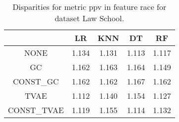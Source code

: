 \begin{table}
\caption{Disparities for metric ppv in feature race for dataset Law School.}
\label{tab:disp-LAW SCHOOL-race-ppv}
\begin{tabular}{ccccc}
\toprule
 & LR & KNN & DT & RF \\
\midrule
NONE & 1.134 & 1.131 & 1.113 & 1.117 \\
GC & 1.162 & 1.163 & 1.164 & 1.149 \\
CONST\_GC & 1.162 & 1.162 & 1.167 & 1.162 \\
TVAE & 1.112 & 1.140 & 1.154 & 1.127 \\
CONST\_TVAE & 1.119 & 1.155 & 1.114 & 1.132 \\
\bottomrule
\end{tabular}
\end{table}
